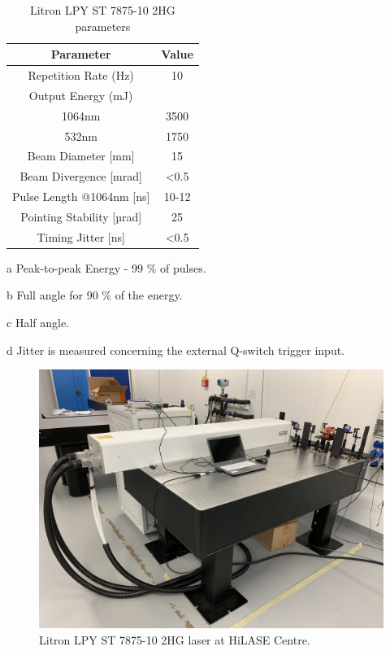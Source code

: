\begin{table}[h!]
\centering
    \begin{threeparttable}
        \begin{tabular}{||c | c||} 
        \hline
            \textbf{Parameter} & \textbf{Value} \\ [0.5ex] 
        \hline\hline
        Repetition Rate (Hz) & 10  \\ 
        \hline
            Output Energy (mJ) & \\
            1064nm & 3500 \\
            532nm & 1750 \\
        \hline
            Beam Diameter [mm] & 15 \tnote{a} \\
        \hline
            Beam Divergence [mrad] & <0.5 \tnote{b} \\ 
        \hline
            Pulse Length @1064nm [ns] & 10-12 \\
        \hline
            Pointing Stability [µrad] & 25 \tnote{c} \\
        \hline
            Timing Jitter [ns] & <0.5 \tnote{d}  \\
        \hline
        \hline
        \end{tabular}
        \begin{tablenotes}
            \small
            \item[a] Peak-to-peak Energy - 99 \% of pulses. 
            \item[b] Full angle for 90 \% of the energy.
            \item[c] Half angle.
            \item[d] Jitter is measured concerning the external Q-switch trigger input.
        \end{tablenotes}
    
        \caption{Litron LPY ST 7875-10 2HG parameters}
        \label{litronparameters}
    \end{threeparttable}
\end{table}

\begin{figure}[h]
    \centering
    \includegraphics[width=0.6\linewidth]{img/litron.JPG}
    \caption{Litron LPY ST 7875-10 2HG laser at HiLASE Centre.}
    \label{fig:spatialprofile}
\end{figure}



